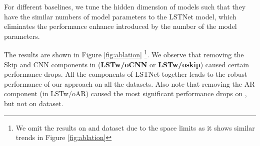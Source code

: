 
For different baselines, we tune the hidden dimension of models such that they have the similar numbers of model parameters to the LSTNet model, which eliminates the performance enhance introduced by the number of the model parameters.

The results are shown in Figure \ref{fig:ablation} \footnote{We omit the results on \traffic and \exchange dataset due to the space limits as it shows similar trends in Figure \ref{fig:ablation}}. We observe that removing the Skip and CNN components in (\textbf{LSTw/oCNN} or \textbf{LSTw/oskip}) caused certain performance drops. All the components of LSTNet together leads to the robust performance of our approach on all the datasets. Also note that removing the AR component (in LSTw/oAR) caused the most significant performance drops on \electricity, but not on \solar dataset.



